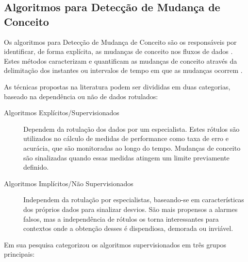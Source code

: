 \documentclass[qual, classic, a4paper]{ufbathesis}
\begin{document}
\subsection{Algoritmos para Detecção de Mudança de Conceito}

Os algoritmos para Detecção de Mudança de Conceito são os responsáveis por identificar, de forma explícita, as mudanças de conceito nos fluxos de dados \cite{Gama:2014:SCD:2597757.2523813}.
Estes métodos caracterizam e quantificam as mudanças de conceito através da delimitação dos instantes ou intervalos de tempo em que as mudanças ocorrem \cite{Basseville:1993:DAC:151741}.

As técnicas propostas na literatura podem ser divididas em duas categorias, baseado na dependência ou não de dados rotulados:
\begin{description}
    \item[Algoritmos Explícitos/Supervisionados] Dependem da rotulação dos dados por um especialista.
    Estes rótulos são utilizados no cálculo de medidas de performance como taxa de erro e acurácia, que são monitoradas ao longo do tempo.
    Mudanças de conceito são sinalizadas quando essas medidas atingem um limite previamente definido.

    \item[Algoritmos Implícitos/Não Supervisionados] Independem da rotulação por especialistas, 
    baseando-se em características dos próprios dados para sinalizar desvios.
    São mais propensos a alarmes falsos, mas a independência de rótulos os torna interessantes para contextos onde a obtenção desses é dispendiosa, demorada ou inviável.
\end{description}

Em sua pesquisa \cite{Gama:2014:SCD:2597757.2523813} categorizou os algoritmos supervisionados em três grupos principais:
\end{document}
